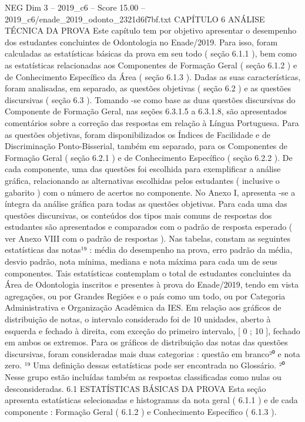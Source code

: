 \begin{textsample}{NEG Dim 3 – 2019\_c6 – Score 15.00 – 2019\_c6/enade\_2019\_odonto\_2321d6f7bf.txt}  \label{ex:f3_neg_269}
CAPÍTULO 6 ANÁLISE TÉCNICA DA PROVA Este capítulo tem por objetivo apresentar o desempenho dos estudantes concluintes de Odontologia no Enade/2019.
Para isso, foram calculadas as estatísticas básicas da prova em seu todo ( seção 6.1.1 ), bem como as estatísticas relacionadas aos Componentes de Formação Geral ( seção 6.1.2 ) e de Conhecimento Específico da Área ( seção 6.1.3 ).
Dadas as suas características, foram analisadas, em separado, as questões objetivas ( seção 6.2 ) e as questões discursivas ( seção 6.3 ).
Tomando -se como base as duas questões discursivas do Componente de Formação Geral, nas seções 6.3.1.5 a 6.3.1.8, são apresentados comentários sobre a correção das respostas em relação à Língua Portuguesa.
Para as questões objetivas, foram disponibilizados os Índices de Facilidade e de Discriminação Ponto-Bisserial, também em separado, para os Componentes de Formação Geral ( seção 6.2.1 ) e de Conhecimento Específico ( seção 6.2.2 ).
De cada componente, uma das questões foi escolhida para exemplificar a análise gráfica, relacionando as alternativas escolhidas pelos estudantes ( inclusive o gabarito ) com o número de acertos no componente.
No Anexo I, apresenta -se a íntegra da análise gráfica para todas as questões objetivas.
Para cada uma das questões discursivas, os conteúdos dos tipos mais comuns de respostas dos estudantes são apresentados e comparados com o padrão de resposta esperado ( ver Anexo VIII com o padrão de respostas ).
Nas tabelas, constam as seguintes estatísticas das notas¹⁹ : média do desempenho na prova, erro padrão da média, desvio padrão, nota mínima, mediana e nota máxima para cada um de seus componentes.
Tais estatísticas contemplam o total de estudantes concluintes da Área de Odontologia inscritos e presentes à prova do Enade/2019, tendo em vista agregações, ou por Grandes Regiões e o país como um todo, ou por Categoria Administrativa e Organização Acadêmica da IES.
Em relação aos gráficos de distribuição de notas, o intervalo considerado foi de 10 unidades, aberto à esquerda e fechado à direita, com exceção do primeiro intervalo, [ 0 ; 10 ], fechado em ambos os extremos.
Para os gráficos de distribuição das notas das questões discursivas, foram consideradas mais duas categorias : questão em branco²⁰ e nota zero. ¹⁹ Uma definição dessas estatísticas pode ser encontrada no Glossário. ²⁰ Nesse grupo estão incluídas também as respostas classificadas como nulas ou desconsideradas. 6.1 ESTATÍSTICAS BÁSICAS DA PROVA Esta seção apresenta estatísticas selecionadas e histogramas da nota geral ( 6.1.1 ) e de cada componente : Formação Geral ( 6.1.2 ) e Conhecimento Específico ( 6.1.3 ).

\end{textsample}
